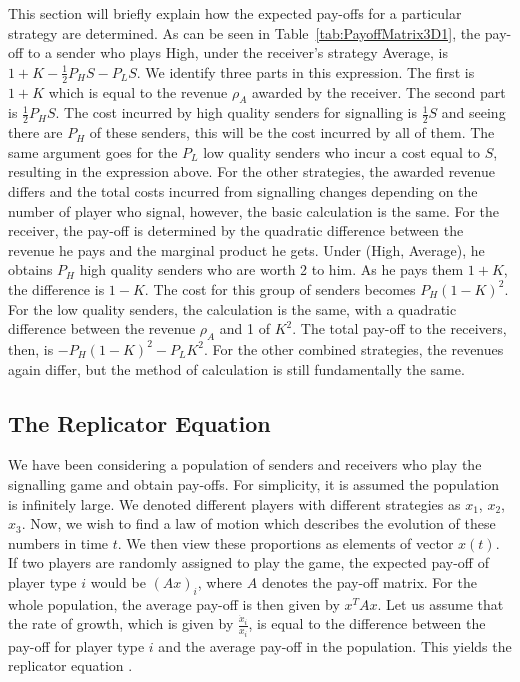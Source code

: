 \documentclass[a4paper,10pt]{article}
\numberwithin{equation}{section}
\begin{document}
This section will briefly explain how the expected pay-offs for a particular strategy are determined. As can be seen in Table~\ref{tab:PayoffMatrix3D1}, the pay-off to a sender who plays High, under the receiver's strategy Average, is $1+K-\frac{1}{2}P_H S-P_L S$. We identify three parts in this expression. The first is $1+K$ which is equal to the revenue $\rho_A$ awarded by the receiver. The second part is $\frac{1}{2}P_H S$. The cost incurred by high quality senders for signalling is $\frac{1}{2}S$ and seeing there are $P_H$ of these senders, this will be the cost incurred by all of them. The same argument goes for the $P_L$ low quality senders who incur a cost equal to $S$, resulting in the expression above. For the other strategies, the awarded revenue differs and the total costs incurred from signalling changes depending on the number of player who signal, however, the basic calculation is the same. For the receiver, the pay-off is determined by the quadratic difference between the revenue he pays and the marginal product he gets. Under (High, Average), he obtains $P_H$ high quality senders who are worth 2 to him. As he pays them $1+K$, the difference is $1-K$. The cost for this group of senders becomes $P_H{(1-K)}^2$. For the low quality senders, the calculation is the same, with a quadratic difference between the revenue $\rho_A$ and 1 of ${K}^2$. The total pay-off to the receivers, then, is $-P_H (1-K)^2-P_L K^2$. For the other combined strategies, the revenues again differ, but the method of calculation is still fundamentally the same.

\subsection{The Replicator Equation}
\label{sec:The Replicator Equation}

We have been considering a population of senders and receivers who play the signalling game and obtain pay-offs. For simplicity, it is assumed the population is infinitely large. We denoted different players with different strategies as $x_1$, $x_2$, $x_3$. Now, we wish to find a law of motion which describes the evolution of these numbers in time $t$. We then view these proportions as elements of vector $x(t)$. If two players are randomly assigned to play the game, the expected pay-off of player type $i$ would be ${(Ax)}_i$, where $A$ denotes the pay-off matrix. For the whole population, the average pay-off is then given by $x^T Ax$. Let us assume that the rate of growth, which is given by $\frac{\dot{x}_i}{x_i}$, is equal to the difference between the pay-off for player type $i$ and the average pay-off in the population. This yields the replicator equation \cite{Hofbauer2003}.
\end{document}
